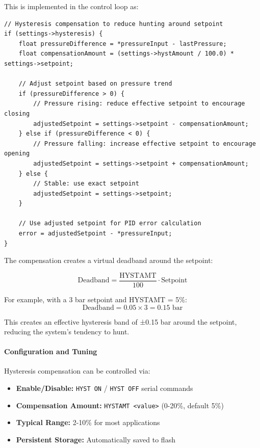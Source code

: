 \documentclass[12pt,a4paper]{article}
\begin{document}
This is implemented in the control loop as:

\begin{lstlisting}[caption=Hysteresis Compensation Mechanism]
// Hysteresis compensation to reduce hunting around setpoint
if (settings->hysteresis) {
    float pressureDifference = *pressureInput - lastPressure;
    float compensationAmount = (settings->hystAmount / 100.0) * settings->setpoint;
    
    // Adjust setpoint based on pressure trend
    if (pressureDifference > 0) {
        // Pressure rising: reduce effective setpoint to encourage closing
        adjustedSetpoint = settings->setpoint - compensationAmount;
    } else if (pressureDifference < 0) {
        // Pressure falling: increase effective setpoint to encourage opening
        adjustedSetpoint = settings->setpoint + compensationAmount;
    } else {
        // Stable: use exact setpoint
        adjustedSetpoint = settings->setpoint;
    }
    
    // Use adjusted setpoint for PID error calculation
    error = adjustedSetpoint - *pressureInput;
}
\end{lstlisting}

The compensation creates a virtual deadband around the setpoint:

\begin{equation}
\text{Deadband} = \frac{\text{HYSTAMT}}{100} \cdot \text{Setpoint}
\end{equation}

For example, with a 3 bar setpoint and HYSTAMT = 5\%:
$$\text{Deadband} = 0.05 \times 3 = 0.15 \text{ bar}$$

This creates an effective hysteresis band of ±0.15 bar around the setpoint, reducing the system's tendency to hunt.

\paragraph{Configuration and Tuning}
Hysteresis compensation can be controlled via:

\begin{itemize}
    \item \textbf{Enable/Disable:} \texttt{HYST ON} / \texttt{HYST OFF} serial commands
    \item \textbf{Compensation Amount:} \texttt{HYSTAMT <value>} (0-20\%, default 5\%)
    \item \textbf{Typical Range:} 2-10\% for most applications
    \item \textbf{Persistent Storage:} Automatically saved to flash
\end{itemize}
\end{document}
